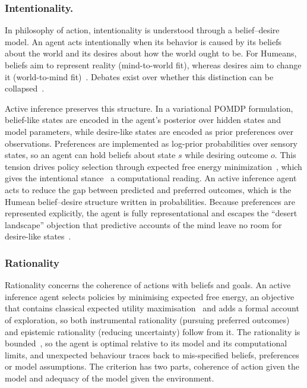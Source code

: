 \documentclass[letterpaper]{article} %
\theoremstyle{definition}
\begin{document}
\subsubsection{Intentionality.}
In philosophy of action, intentionality is understood through a belief--desire model. An agent acts intentionally when its behavior is caused by its beliefs about the world and its desires about how the world ought to be. For Humeans, beliefs aim to represent reality (mind-to-world fit), whereas desires aim to change it (world-to-mind fit)~\citep{smithHumeanTheoryMotivation1987}. Debates exist over whether this distinction can be collapsed~\citep{junker2024predictive}.

Active inference preserves this structure. In a variational POMDP formulation, belief-like states are encoded in the agent's posterior over hidden states and model parameters, while desire-like states are encoded as prior preferences over observations. Preferences are implemented as log-prior probabilities over sensory states, so an agent can hold beliefs about state $s$ while desiring outcome $o$. This tension drives policy selection through expected free energy minimization~\citep{parrActiveInferenceFree2022a}, which gives the intentional stance~\citep{dennettIntentionalStance1987} a computational reading. An active inference agent acts to reduce the gap between predicted and preferred outcomes, which is the Humean belief--desire structure written in probabilities. Because preferences are represented explicitly, the agent is fully representational and escapes the ``desert landscape'' objection that predictive accounts of the mind leave no room for desire-like states~\citep{williamsDesertLandscape2018}.

\subsubsection{Rationality}
Rationality concerns the coherence of actions with beliefs and goals. An active inference agent selects policies by minimising expected free energy, an objective that contains classical expected utility maximisation~\citep{dacostaRewardMaximizationDiscrete2023} and adds a formal account of exploration, so both instrumental rationality (pursuing preferred outcomes) and epistemic rationality (reducing uncertainty) follow from it. The rationality is bounded~\citep{simonModelsMan1957,ortegaThermodynamicsFreeEnergy2013}, so the agent is optimal relative to its model and its computational limits, and unexpected behaviour traces back to mis-specified beliefs, preferences or model assumptions. The criterion has two parts, coherence of action given the model and adequacy of the model given the environment.
\end{document}

